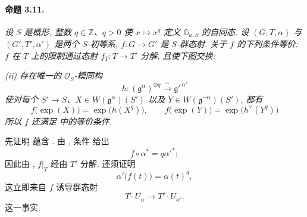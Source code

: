 \paragraph{\textbf{命题 3.11.}}
\emph{设 \(S\) 是概形, 整数 \(q\in\mathbb Z\)、\(q>0\) 使 \(x\mapsto x^q\) 定义 \(\mathbb G_{a,S}\) 的自同态. 设 \((G,T,\alpha)\) 与 \((G',T',\alpha')\) 是两个 \(S\)-初等系, \(f\colon G\to G'\) 是 \(S\)-群态射. 关于 \(f\) 的下列条件等价:}
\smallskip
\noindent\emph{\textup{} \(f\) 在 \(T\) 上的限制通过态射 \(f_T\colon T\to T'\) 分解, 且使下图交换:}
\begin{center}
\end{center}
\smallskip
\noindent\emph{\textup{(ii)} 存在唯一的 \(\mathcal O_S\)-模同构}
\[
  h\colon(\mathfrak g^\alpha)^{\otimes q}
    \xrightarrow{\ \sim\ }\mathfrak g'^{\,\alpha'}
\]
\emph{使对每个 \(S'\to S\)、\(X\in W(\mathfrak g^\alpha)(S')\) 以及 \(Y\in W(\mathfrak g^{-\alpha})(S')\), 都有}
\[
  f\bigl(\exp(X)\bigr)=\exp\bigl(h(X^q)\bigr),
  \qquad
  f\bigl(\exp(Y)\bigr)=\exp\bigl(h^\vee(Y^q)\bigr)
\]
\emph{所以 \(f\) 还满足  中的等价条件.}

\smallskip
先证明 \textup{} 蕴含 \textup{}. 由 , 条件 \textup{} 给出
\[
  f\circ\alpha^\ast=q\alpha'^\ast;
\]
因此由 , \(f|_T\) 经由 \(T'\) 分解. 还须证明
\[
  \alpha'\bigl(f(t)\bigr)=\alpha(t)^q,
\]
这立即来自 \(f\) 诱导群态射
\[
  T\cdot U_\alpha\longrightarrow T'\cdot U_{\alpha'}.
\]
这一事实.

